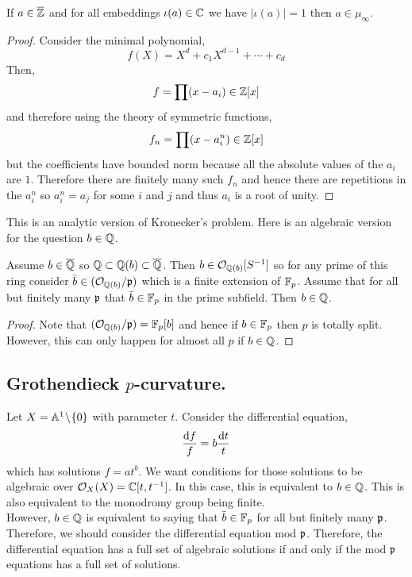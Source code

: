 \documentclass[12pt]{article}
\begin{document}
\begin{prop}[Kronecker]
If $a \in \overline{\mathbb{Z}}$ and for all embeddings $\iota(a) \in \mathbb{C}$ we have $|\iota(a)| = 1$ then $a \in \mu_{\infty}$.
\end{prop}

\begin{proof}
Consider the minimal polynomial,
\[ f(X) = X^d + c_1 X^{d-1} + \cdots + c_d \]
Then,
\[ f = \prod (x - a_i) \in \mathbb{Z}[x] \]
and therefore using the theory of symmetric functions,
\[ f_n = \prod (x - a_i^n) \in \mathbb{Z}[x] \]
but the coefficients have bounded norm because all the absolute values of the $a_i$ are $1$. Therefore there are finitely many such $f_n$ and hence there are repetitions in the $a_i^n$ so $a_i^n = a_j$ for some $i$ and $j$ and thus $a_i$ is a root of unity. 
\end{proof}

\begin{rmk}
This is an analytic version of Kronecker's problem. Here is an algebraic version for the question $b \in \mathbb{Q}$. 
\end{rmk}

\begin{theorem}
Assume $b \in \overline{\mathbb{Q}}$ so $\mathbb{Q} \subset \mathbb{Q}(b) \subset \overline{\mathbb{Q}}$. Then $b \in \mathcal{O}_{\mathbb{Q}(b)}[S^{-1}]$ so for any prime of this ring consider $\bar{b} \in (\mathcal{O}_{\mathbb{Q}(b)} / \mathfrak{p})$ which is a finite extension of $\mathbb{F}_p$. Assume that for all but finitely many $\mathfrak{p}$ that $\bar{b} \in \mathbb{F}_p$ in the prime subfield. Then $b \in \mathbb{Q}$.
\end{theorem}

\begin{proof}
Note that $(\mathcal{O}_{\mathbb{Q}(b)} / \mathfrak{p}) = \mathbb{F}_p[b]$ and hence if $b \in \mathbb{F}_p$ then $p$ is totally split. However, this can only happen for almost all $p$ if $b \in \mathbb{Q}$.
\end{proof}

\subsection{Grothendieck $p$-curvature.}

Let $X = \mathbb{A}^1 \! \setminus \! \{ 0 \}$ with parameter $t$. Consider the differential equation,
\[ \frac{\mathrm{d}{f}}{f} = b \frac{\mathrm{d}{t}}{t} \]
which has solutions $f = a t^b$. We want conditions for those solutions to be algebraic over $\mathcal{O}_{X}(X) = \mathbb{C}[t, t^{-1}]$. In this case, this is equivalent to $b \in \mathbb{Q}$. This is also equivalent to the monodromy group being finite. 
\bigskip\\
However, $b \in \mathbb{Q}$ is equivalent to saying that $\bar{b} \in \mathbb{F}_p$ for all but finitely many $\mathfrak{p}$. Therefore, we should consider the differential equation mod $\mathfrak{p}$. Therefore, the differential equation has a full set of algebraic solutions if and only if the mod $\mathfrak{p}$ equations has a full set of solutions. 
\end{document}
